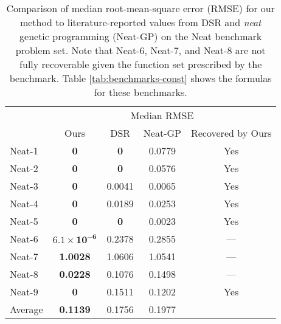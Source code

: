 \documentclass{article}
\begin{document}
\begin{table}[htbp]
  \centering
  \caption{Comparison of median root-mean-square error (RMSE) for our method to literature-reported values from DSR \citep{petersen2019deep} and \textit{neat} genetic programming (Neat-GP) \citep{trujillo2016neat} on the Neat benchmark problem set.
  Note that Neat-6, Neat-7, and Neat-8 are not fully recoverable given the function set prescribed by the benchmark. Table \ref{tab:benchmarks-const} shows the formulas for these benchmarks.}
    \begin{tabular}{lcccc}
    & \multicolumn{4}{c}{Median RMSE} \\
    & Ours & DSR & Neat-GP & Recovered by Ours \\
    \cmidrule{2-5}    
    Neat-1 & \textbf{0} & \textbf{0} & 0.0779 & Yes \\
    Neat-2 & \textbf{0} & \textbf{0} & 0.0576 & Yes \\
    Neat-3 & \textbf{0} & 0.0041 & 0.0065 & Yes \\
    Neat-4 & \textbf{0} & 0.0189 & 0.0253 & Yes \\
    Neat-5 & \textbf{0} & \textbf{0} & 0.0023 & Yes \\
    Neat-6 & $\bm{6.1 \times 10^{-6}}$ & 0.2378 & 0.2855 & --- \\
    Neat-7 & \textbf{1.0028} & 1.0606 & 1.0541 & --- \\
    Neat-8 & \textbf{0.0228} & 0.1076 & 0.1498 & --- \\
    Neat-9 & \textbf{0} & 0.1511 & 0.1202 & Yes \\
    \midrule
    Average & \textbf{0.1139} & 0.1756 & 0.1977 & \\
    \end{tabular}
  \label{tab:neat}
\end{table}
\end{document}
